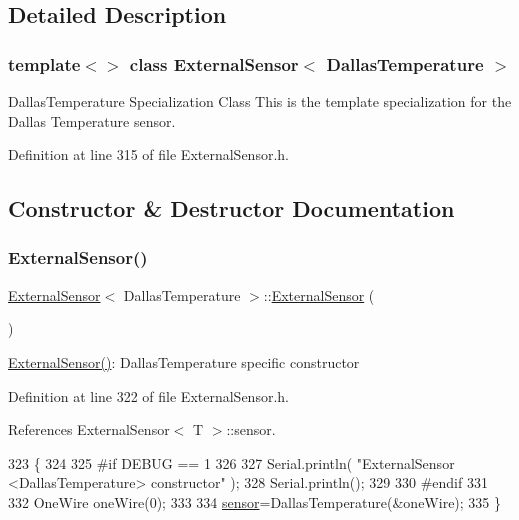 \subsection{Detailed Description}
\subsubsection*{template$<$$>$\newline
class External\+Sensor$<$ Dallas\+Temperature $>$}

Dallas\+Temperature Specialization Class This is the template specialization for the Dallas Temperature sensor. 

Definition at line 315 of file External\+Sensor.\+h.



\subsection{Constructor \& Destructor Documentation}
\mbox{\label{classExternalSensor_3_01DallasTemperature_01_4_ad290681e8780cdf1870416eee99d699d}} 
\subsubsection{\texorpdfstring{External\+Sensor()}{ExternalSensor()}}
{\footnotesize\ttfamily \hyperlink{classExternalSensor}{External\+Sensor}$<$ Dallas\+Temperature $>$\+::\hyperlink{classExternalSensor}{External\+Sensor} (\begin{DoxyParamCaption}{ }\end{DoxyParamCaption})\hspace{0.3cm}{\ttfamily [inline]}}

\hyperlink{classExternalSensor_3_01DallasTemperature_01_4_ad290681e8780cdf1870416eee99d699d}{External\+Sensor()}\+: Dallas\+Temperature specific constructor 

Definition at line 322 of file External\+Sensor.\+h.



References External\+Sensor$<$ T $>$\+::sensor.


\begin{DoxyCode}
323     \{
324         
325 \textcolor{preprocessor}{    #if DEBUG == 1 }
326 
327         Serial.println( \textcolor{stringliteral}{"ExternalSensor <DallasTemperature> constructor"} );
328         Serial.println();
329     
330 \textcolor{preprocessor}{    #endif}
331 
332         OneWire oneWire(0);
333         
334         \hyperlink{classExternalSensor_3_01DallasTemperature_01_4_adb6ba4fcdedef95ad8f6b0c9b6c0f9d1}{sensor}=DallasTemperature(&oneWire);
335     \}
\end{DoxyCode}


